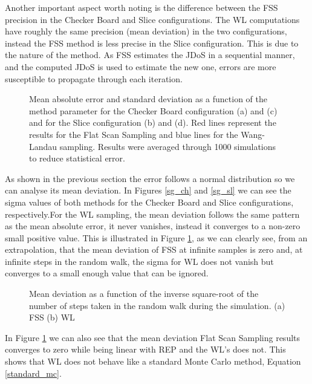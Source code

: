 	Another important aspect worth noting is the difference between the FSS precision in the Checker Board and Slice configurations. The WL computations have roughly the same precision (mean deviation) in the two configurations, instead the FSS method is less precise in the Slice configuration. This is due to the nature of the method. As FSS estimates the JDoS in a sequential manner, and the computed JDoS is used to estimate the new one, errors are more susceptible to propagate through each iteration.
	
	\pagebreak
	
\begin{figure}[h]
	\centering

	
	\caption{Mean absolute error and standard deviation as a function of the method parameter for the Checker Board configuration (a) and (c) and for the Slice configuration (b) and (d). Red lines represent the results for the Flat Scan Sampling and blue lines for the Wang-Landau sampling. Results were averaged through 1000 simulations to reduce statistical error.}
\end{figure}

	As shown in the previous section the error follows a normal distribution so we can analyse its mean deviation. In Figures \ref{sg_ch} and \ref{sg_sl} we can see the sigma values of both methods for the Checker Board and Slice configurations, respectively.For the WL sampling, the mean deviation follows the same pattern as the mean absolute error, it never vanishes, instead it converges to a non-zero small positive value. This is illustrated in Figure \ref{fit_comp}, as we can clearly see, from an extrapolation, that the mean deviation of FSS at infinite samples is zero and, at infinite steps in the random walk, the sigma for WL does not vanish but converges to a small enough value that can be ignored.

\begin{figure}[h]
	\centering
	
	\caption{Mean deviation as a function of the inverse square-root of the number of steps taken in the random walk during the simulation. (a) FSS (b) WL}
	\label{fit_comp}
\end{figure}

	In Figure \ref{fit_comp} we can also see that the mean deviation Flat Scan Sampling results converges to zero while being linear with REP and the WL's does not. This shows that WL does not behave like a standard Monte Carlo method, Equation \ref{standard_mc}.




















